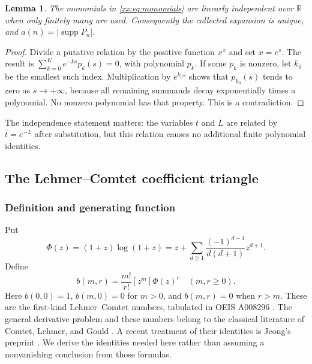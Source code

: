 \documentclass[11pt,a4paper]{article}
\numberwithin{equation}{section}
\newtheorem{lemma}[theorem]{Lemma}
\theoremstyle{definition}
\theoremstyle{remark}
\theoremstyle{plain}
\DeclareMathOperator{\supp}{supp}
\newcommand{\R}{\mathbb R}
\newcommand{\coef}[2]{[#1^{#2}]}
\begin{document}
\begin{lemma}\label{xx:lem:independence}
The monomials in \eqref{xx:eq:monomials} are linearly independent over $\R$
when only finitely many are used. Consequently the collected expansion is
unique, and $a(n)=|\supp P_n|$.
\end{lemma}
\begin{proof}
Divide a putative relation by the positive function $x^x$ and set $x=e^s$.
The result is $\sum_{k=0}^K e^{-ks}p_k(s)=0$, with polynomial $p_k$.
If some $p_k$ is nonzero, let $k_0$ be the smallest such index. Multiplication
by $e^{k_0s}$ shows that $p_{k_0}(s)$ tends to zero as $s\to+\infty$, because
all remaining summands decay exponentially times a polynomial. No nonzero
polynomial has that property. This is a contradiction.
\end{proof}

The independence statement matters: the variables $t$ and $L$ are related
by $t=e^{-L}$ after substitution, but this relation causes no additional
finite polynomial identities.

\subsection{The Lehmer--Comtet coefficient triangle}

\subsubsection{Definition and generating function}
Put
\begin{equation}\label{xx:eq:phi}
 \Phi(z)=(1+z)\log(1+z)
 =z+\sum_{d\ge1}\frac{(-1)^{d-1}}{d(d+1)}z^{d+1}.
\end{equation}
Define
\begin{equation}\label{xx:eq:bdef}
 b(m,r)=\frac{m!}{r!}\coef{z}{m}\Phi(z)^r
 \quad(m,r\ge0).
\end{equation}
Here $b(0,0)=1$, $b(m,0)=0$ for $m>0$, and $b(m,r)=0$ when $r>m$.
These are the first-kind Lehmer--Comtet numbers, tabulated in OEIS A008296
\cite{oeis8296}. The general derivative problem and these numbers belong to
the classical literature of Comtet, Lehmer, and Gould
\cite{comtet,lehmer,gould}. A recent treatment of their identities is
Jeong's preprint \cite{jeong}. We derive the identities needed here rather
than assuming a nonvanishing conclusion from those formulas.
\end{document}
